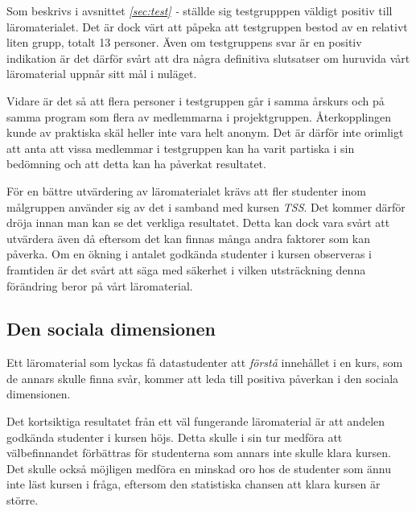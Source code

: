 \documentclass[12pt,a4paper,twoside,openright]{article}
\begin{document}
Som beskrivs i avsnittet \textit{\ref{sec:test} - } ställde sig testgrupppen
väldigt positiv till läromaterialet. Det är dock värt att påpeka att
testgruppen bestod av en relativt liten grupp, totalt 13 personer.
Även om testgruppens svar är en positiv indikation är det därför svårt
att dra några definitiva slutsatser om huruvida vårt läromaterial
uppnår sitt mål i nuläget.

Vidare är det så att flera personer i testgruppen går i samma årskurs
och på samma program som flera av medlemmarna i
projektgruppen. Återkopplingen kunde av praktiska skäl heller inte
vara helt anonym. Det är därför inte orimligt att anta att vissa
medlemmar i testgruppen kan ha varit partiska i sin bedömning och att
detta kan ha påverkat resultatet.

För en bättre utvärdering av läromaterialet krävs att fler studenter
inom målgruppen använder sig av det i samband med kursen
\textit{TSS}. Det kommer därför dröja innan man kan se det verkliga
resultatet. Detta kan dock vara svårt att utvärdera även då eftersom
det kan finnas många andra faktorer som kan påverka. Om en ökning i
antalet godkända studenter i kursen observeras i framtiden är det
svårt att säga med säkerhet i vilken utsträckning denna förändring
beror på vårt läromaterial.


\subsection{Den sociala dimensionen}

Ett läromaterial som lyckas få datastudenter att \emph{förstå}
innehållet i en kurs, som de annars skulle finna svår, kommer att leda
till positiva påverkan i den sociala dimensionen. 

Det kortsiktiga resultatet från ett väl fungerande läromaterial är att
andelen godkända studenter i kursen höjs. Detta skulle i sin tur
medföra att välbefinnandet förbättras för studenterna som annars inte
skulle klara kursen. Det skulle också möjligen medföra en minskad oro
hos de studenter som ännu inte läst kursen i fråga, eftersom den
statistiska chansen att klara kursen är större.
\end{document}
